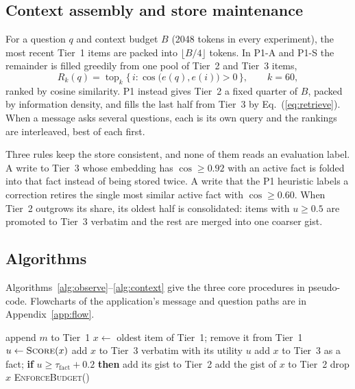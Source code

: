\subsection{Context assembly and store maintenance}
For a question $q$ and context budget $B$ (2048 tokens in every experiment),
the most recent Tier~1 items are packed into $\lfloor B/4\rfloor$ tokens. In
P1-A and P1-S the remainder is filled greedily from one pool of Tier~2 and
Tier~3 items,
\begin{equation}
\label{eq:retrieve}
R_k(q)=\operatorname{top}_k\big\{\,i : \cos\!\big(e(q),e(i)\big)>0\,\big\},\qquad k=60,
\end{equation}
ranked by cosine similarity. P1 instead gives Tier~2 a fixed quarter of $B$,
packed by information density, and fills the last half from Tier~3 by
Eq.~(\ref{eq:retrieve}). When a message asks several questions, each is its
own query and the rankings are interleaved, best of each first.

Three rules keep the store consistent, and none of them reads an evaluation
label. A write to Tier~3 whose embedding has $\cos\ge0.92$ with an active fact
is folded into that fact instead of being stored twice. A write that the P1
heuristic labels a correction retires the single most similar active fact
with $\cos\ge0.60$. When Tier~2 outgrows its share, its oldest half is
consolidated: items with $u\ge0.5$ are promoted to Tier~3 verbatim and the rest
are merged into one coarser gist.

\subsection{Algorithms}
Algorithms~\ref{alg:observe}--\ref{alg:context} give the three core
procedures in pseudo-code. Flowcharts of the application's message and
question paths are in Appendix~\ref{app:flow}.

\begin{algorithm}[htbp]
\caption{Write path: \textsc{Observe}$(m)$ for policies P1, P1-A and P1-S}
\label{alg:observe}
\begin{algorithmic}[1]
\State append $m$ to Tier~1 
  \State $x \gets$ oldest item of Tier~1; remove it from Tier~1
  \State $u \gets \textsc{Score}(x)$ 
     \State add $x$ to Tier~3 verbatim with its utility $u$
     \State add $x$ to Tier~3 as a fact; \textbf{if} $u \ge \tau_{\text{fact}}+0.2$ \textbf{then} add its gist to Tier~2
     \State add the gist of $x$ to Tier~2
  \Else
     \State drop $x$
  \EndIf
  \State \textsc{EnforceBudget}()
\EndIf
\end{algorithmic}
\end{algorithm}

